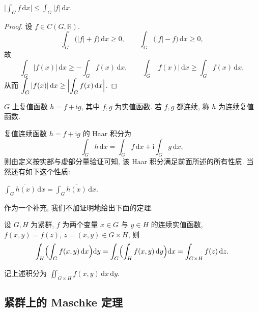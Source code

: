 \begin{proposition}\label{prop:haar-integral-triangle}
$\bigl|\int_G f\,\mathrm{d}x\bigr|\le\int_G|f|\,\mathrm{d}x$.
\end{proposition}

\begin{proof}
设 $f\in C(G,\mathbb{R})$.
\[
  \int_G\bigl(|f|+f\bigr)\,\mathrm{d}x\ge0,\qquad \int_G\bigl(|f|-f\bigr)\,\mathrm{d}x\ge0,
\]
故
\[
  \int_G|f(x)|\,\mathrm{d}x\ge-\int_G f(x)\,\mathrm{d}x,\qquad
  \int_G|f(x)|\,\mathrm{d}x\ge\int_G f(x)\,\mathrm{d}x,
\]
从而 $\displaystyle\int_G|f(x)|\,\mathrm{d}x\ge\Bigl|\int_G f(x)\,\mathrm{d}x\Bigr|$.
\end{proof}

\begin{definition}\label{def:complex-continuous}
$G$ 上复值函数 $h=f+\mathrm{i}g$, 其中 $f,g$ 为实值函数. 若 $f,g$ 都连续,
称 $h$ 为连续复值函数.
\end{definition}

复值连续函数 $h=f+\mathrm{i}g$ 的 Haar 积分为
\[
  \int_G h\,\mathrm{d}x=\int_G f\,\mathrm{d}x+\mathrm{i}\int_G g\,\mathrm{d}x,
\]
则由定义按实部与虚部分量验证可知, 该 Haar 积分满足前面所述的所有性质. 当然还有如下这个性质:

\begin{proposition}\label{prop:haar-conjugate}
$\displaystyle\overline{\int_G h(x)\,\mathrm{d}x}=\int_G\overline{h(x)}\,\mathrm{d}x$.
\end{proposition}

作为一个补充, 我们不加证明地给出下面的定理.

\begin{theorem}[Fubini]\label{thm:fubini-haar}
设 $G,H$ 为紧群, $f$ 为两个变量 $x\in G$ 与 $y\in H$ 的连续实值函数,
$f(x,y)=f(z)$, $z=(x,y)\in G\times H$, 则
\[
  \int_H\Bigl(\int_G f(x,y)\,\mathrm{d}x\Bigr)\mathrm{d}y
  =\int_G\Bigl(\int_H f(x,y)\,\mathrm{d}y\Bigr)\mathrm{d}x
  =\int_{G\times H}f(z)\,\mathrm{d}z .
\]
\end{theorem}

\begin{remark}\label{rem:product-haar-integral}
记上述积分为 $\displaystyle\iint_{G\times H}f(x,y)\,\mathrm{d}x\,\mathrm{d}y$.
\end{remark}

\subsection{紧群上的 Maschke 定理}

